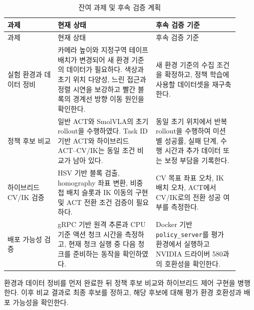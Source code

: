 \documentclass[titlepage]{pnureport}
\begin{document}
\begin{longtable}{@{}p{0.20\linewidth}p{0.39\linewidth}p{0.33\linewidth}@{}}
\caption{잔여 과제 및 후속 검증 계획}\label{tab:next-steps}\\
\toprule
과제 & 현재 상태 & 후속 검증 기준 \\
\midrule
\endfirsthead
\toprule
과제 & 현재 상태 & 후속 검증 기준 \\
\midrule
\endhead
실험 환경과 데이터 정비 & 카메라 높이와 지정구역 테이프 배치가 변경되어 새 환경 기준의 데이터가 필요하다. 색상과 초기 위치 다양성, 느린 접근과 정렬 시연을 보강하고 빨간 블록의 경계선 방향 이동 원인을 확인한다. & 새 환경 기준의 수집 조건을 확정하고, 정책 학습에 사용할 데이터셋을 재구축한다. \\
\addlinespace
정책 후보 비교 & 일반 ACT와 SmolVLA의 초기 rollout을 수행하였다. Task ID 기반 ACT와 하이브리드 ACT--CV/IK는 동일 조건 비교가 남아 있다. & 동일 초기 위치에서 반복 rollout을 수행하여 미션별 성공률, 실패 단계, 수행 시간과 추가 데이터 또는 보정 부담을 기록한다. \\
\addlinespace
하이브리드 CV/IK 검증 & HSV 기반 블록 검출, homography 좌표 변환, 비중첩 배치 슬롯과 IK 이동의 구현 및 ACT 전환 조건 검증이 필요하다. & CV 목표 좌표 오차, IK 배치 오차, ACT에서 CV/IK로의 전환 성공 여부를 측정한다. \\
\addlinespace
배포 가능성 검증 & gRPC 기반 원격 추론과 CPU 기준 액션 청크 시간을 측정하고, 현재 청크 실행 중 다음 청크를 준비하는 동작을 확인하였다. & Docker 기반 \texttt{policy\_server}를 평가 환경에서 실행하고 NVIDIA 드라이버 580과의 호환성을 확인한다. \\
\bottomrule
\end{longtable}

환경과 데이터 정비를 먼저 완료한 뒤 정책 후보 비교와 하이브리드 제어 구현을 병행한다. 이후 비교 결과로 최종 후보를 정하고, 해당 후보에 대해 평가 환경 호환성과 배포 가능성을 확인한다.
\end{document}
